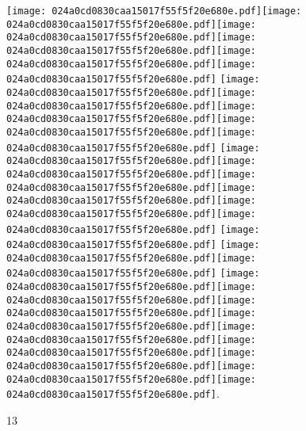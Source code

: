 \documentclass{article}
\newcommand{\origpg}[2]{\texttt{[image: 024a0cd0830caa15017f55f5f20e680e.pdf]}}
\begin{document}
{\vspace{0.626pt}\origpg{13}{85.303pt 272.53pt 93.518pt 288.67pt}\origpg{13}{93.518pt 272.53pt 104.67pt 288.67pt}\hspace{-0.339pt}\origpg{13}{104.33pt 272.53pt 111.5pt 288.67pt}\hspace{-0.178pt}\origpg{13}{111.32pt 272.53pt 118.37pt 288.67pt}\hspace{-0.307pt}\origpg{13}{118.07pt 272.53pt 126.14pt 288.67pt}\hspace{-0.113pt}\origpg{13}{126.02pt 272.53pt 133.64pt 288.67pt} \origpg{13}{137.81pt 272.53pt 148.02pt 288.67pt}\origpg{13}{147.93pt 272.53pt 156pt 288.67pt}\hspace{-0.597pt}\origpg{13}{155.4pt 272.53pt 166.55pt 288.67pt}\origpg{13}{166.49pt 272.53pt 175.12pt 288.67pt}\origpg{13}{175.12pt 272.53pt 183.19pt 288.67pt} \origpg{13}{187.2pt 272.53pt 194.36pt 288.67pt}\origpg{13}{194.41pt 272.53pt 202.48pt 288.67pt}\hspace{-1.324pt}\origpg{13}{201.16pt 272.53pt 209.37pt 288.67pt}\origpg{13}{209.41pt 272.53pt 218.05pt 288.67pt}\origpg{13}{218.05pt 272.53pt 225.1pt 288.67pt}\origpg{13}{225.1pt 272.53pt 232.46pt 288.67pt} \origpg{13}{236.66pt 272.53pt 244.73pt 288.67pt} \origpg{13}{248.7pt 272.53pt 255.87pt 288.67pt}\hspace{-0.178pt}\origpg{13}{255.69pt 272.53pt 262.86pt 288.67pt} \origpg{13}{266.77pt 272.53pt 273.93pt 288.67pt}\origpg{13}{273.98pt 272.53pt 282.05pt 288.67pt}\hspace{0.339pt}\origpg{13}{282.39pt 272.53pt 289.56pt 288.67pt}\origpg{13}{289.6pt 272.53pt 296.66pt 288.67pt}\hspace{-0.307pt}\origpg{13}{296.35pt 272.53pt 304.42pt 288.67pt}\hspace{-0.355pt}\origpg{13}{304.07pt 272.53pt 311.49pt 288.67pt}\origpg{13}{311.49pt 272.53pt 320.13pt 288.67pt}\origpg{13}{320.19pt 272.53pt 328.83pt 288.67pt}\hspace{-0.21pt}\origpg{13}{328.62pt 272.53pt 337.25pt 288.67pt}.  

\vspace{27.944pt} 

\vspace{32.06pt}{\fontsize{19.995pt}{23.994pt}\selectfont{}\hspace{36.161pt} \hspace{139.59pt} }

\vspace{162.8pt}\hspace{226.78pt}13 

\vspace{18.308pt} }%
\end{document}

